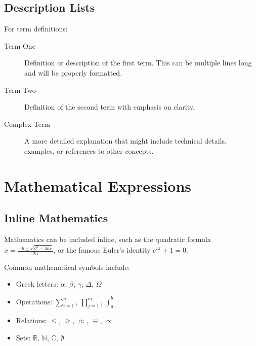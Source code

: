 \subsection{Description Lists}
\label{subsec:description_lists}

For term definitions:

\begin{description}
	\item[Term One] Definition or description of the first term. This can be
		multiple lines long and will be properly formatted.
	\item[Term Two] Definition of the second term with emphasis on clarity.
	\item[Complex Term] A more detailed explanation that might include
		technical details, examples, or references to other concepts.
\end{description}

\section{Mathematical Expressions}
\label{sec:mathematics}

\subsection{Inline Mathematics}
\label{subsec:inline_math}

Mathematics can be included inline, such as the quadratic formula
$x = \frac{-b \pm \sqrt{b^2 - 4ac}}{2a}$, or the famous Euler's identity
$e^{i\pi} + 1 = 0$.

Common mathematical symbols include:
\begin{itemize}
	\item Greek letters: $\alpha$, $\beta$, $\gamma$, $\Delta$, $\Omega$
	\item Operations: $\sum_{i=1}^{n}$, $\prod_{j=1}^{m}$, $\int_{a}^{b}$
	\item Relations: $\leq$, $\geq$, $\approx$, $\equiv$, $\propto$
	\item Sets: $\mathbb{R}$, $\mathbb{N}$, $\mathbb{C}$, $\emptyset$
\end{itemize}

